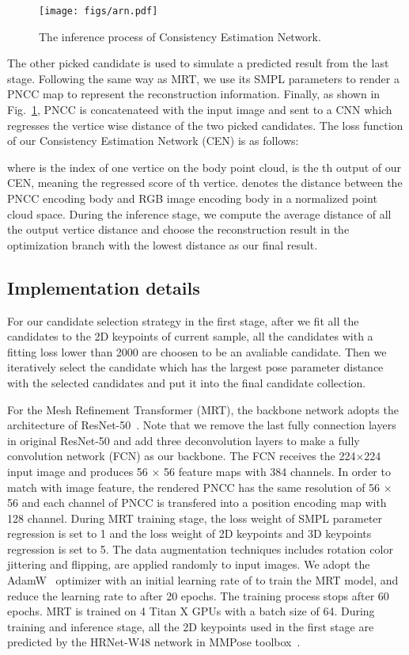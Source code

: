 \documentclass[sigconf]{acmart}
\begin{document}
\begin{figure}[t]
	\begin{center}
\texttt{[image: figs/arn.pdf]}
	\end{center}
	\caption{The inference process of Consistency Estimation Network.}
	\label{fig:arn}
\end{figure}


The other picked candidate is used to simulate a predicted result from the last stage. Following the same way as MRT, we use its SMPL parameters to render a PNCC map to represent the reconstruction information. Finally, as shown in Fig.~\ref{fig:arn}, PNCC is concatenateed 
with the input image and sent to a CNN which regresses the vertice wise distance of the two picked candidates. 
The loss function of our Consistency Estimation Network (CEN) is as follows:

where  is the index of one vertice on the body point cloud,  is the th output of our CEN, 
meaning the regressed score of th vertice. 
 denotes the distance between the PNCC encoding body and RGB image encoding body 
in a normalized point cloud space. During the inference stage, we 
compute the average distance of all the output vertice distance and choose the reconstruction result in the optimization branch with the 
lowest distance as our final result.


\subsection{Implementation details}
For our candidate selection strategy in the first stage, after we fit all the candidates to the 2D keypoints 
of current sample, all the candidates with a fitting loss lower than 2000 are choosen to be an avaliable candidate. 
Then we iteratively select the candidate which has the largest pose parameter distance with the selected candidates 
and put it into the final candidate collection. 

For the Mesh Refinement Transformer (MRT), the backbone network adopts the architecture 
of ResNet-50~\cite{he2016deep}. Note that we remove the last fully connection layers in original ResNet-50 and add three deconvolution layers to make a fully convolution network (FCN) as our backbone. The FCN receives the 224×224
input image and produces 56 × 56 feature maps with 384 channels. In order to match with image feature, the rendered 
PNCC has the same resolution of 56 × 56 and each channel of PNCC is transfered into a position encoding map with 128 channel. During MRT training stage, the loss weight of SMPL parameter regression is set to 1 and the loss weight 
of 2D keypoints and 3D keypoints regression is set to 5. The data augmentation techniques includes 
rotation  color jittering  and flipping, are
applied randomly to input images. We adopt the AdamW~\cite{loshchilov2017decoupled} optimizer with 
an initial learning rate of  to train the MRT model, and reduce the learning
rate to  after 20 epochs. The training process stops after 60 epochs. MRT is trained on 4 
Titan X GPUs with a batch size of 64. 
During training and inference stage, all the 2D keypoints used in the first stage are predicted by 
the HRNet-W48 network in MMPose toolbox~\cite{mmpose2020}.
\end{document}
